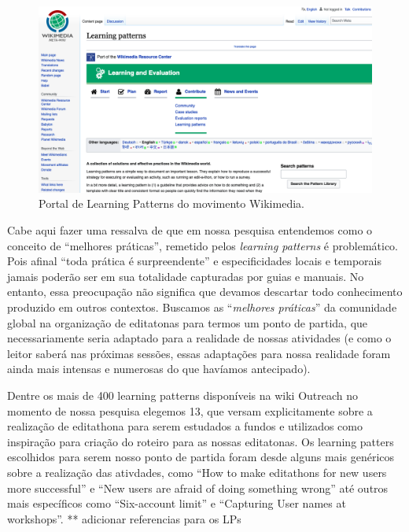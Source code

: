 \begin{figure}[H]
    \centering
    \includegraphics[width=1\textwidth]{Images/learning_patterns.png}
    \caption{Portal de Learning Patterns do movimento Wikimedia.}
    \label{fig:learning_patterns}
\end{figure}

Cabe aqui fazer uma ressalva de que em nossa pesquisa entendemos como o conceito de ``melhores práticas'', remetido pelos \textit{learning patterns} é problemático. Pois afinal ``toda prática é surpreendente'' \citep{cukierman_pasteur_2007} e especificidades locais e temporais jamais poderão ser em sua totalidade capturadas por guias e manuais. No entanto, essa preocupação não significa que devamos descartar todo conhecimento produzido em outros contextos. Buscamos as ``\textit{melhores práticas}'' da comunidade global na organização de editatonas para termos um ponto de partida, que necessariamente seria adaptado para a realidade de nossas atividades (e como o leitor saberá nas próximas sessões, essas adaptações para nossa realidade foram ainda mais intensas e numerosas do que havíamos antecipado).

Dentre os mais de 400 learning patterns disponíveis na wiki Outreach no momento de nossa pesquisa elegemos 13, que versam explicitamente sobre a realização de editathona para serem estudados a fundos e utilizados como inspiração para criação do roteiro para as nossas editatonas. Os learning patters escolhidos para serem nosso ponto de partida foram desde alguns mais genéricos sobre a realização das ativdades, como ``How to make editathons for new users more successful'' e ``New users are afraid of doing something wrong'' até outros mais específicos como ``Six-account limit'' e ``Capturing User names at workshops''. 
** adicionar referencias para os LPs

